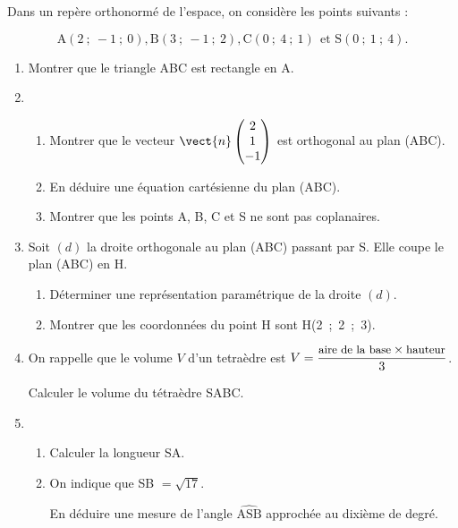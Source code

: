 
\medskip

Dans un repère orthonormé de l'espace, on considère les points suivants :

\[\text{A}(2~;~-1~;~0), \text{B}(3~;~-1~;~2), \text{C}(0~;~4~;~1) \: \: \text{et S} (0~;~1~;~4).\]

\smallskip

\begin{enumerate}
\item Montrer que le triangle ABC est rectangle en A.
\item  
	\begin{enumerate}
		\item Montrer que le vecteur $\vect{n}\begin{pmatrix}2\\1\\- 1\end{pmatrix}$ est orthogonal au plan (ABC).
		\item En déduire une équation cartésienne du plan (ABC).
		\item Montrer que les points A, B, C et S ne sont pas coplanaires.
	\end{enumerate}
\item  Soit $(d)$ la droite orthogonale au plan (ABC) passant par S. Elle coupe le plan (ABC) en H.
	\begin{enumerate}
		\item Déterminer une représentation paramétrique de la droite $(d)$.
		\item Montrer que les coordonnées du point H sont H(2~;~2~;~3).
	\end{enumerate}
\item  On rappelle que le volume $V$ d'un tetraèdre est $V = \dfrac{\small \text{aire de la base} \times \text{hauteur}}{3}$.

 Calculer le volume du tétraèdre SABC.
\item  
	\begin{enumerate}
		\item Calculer la longueur SA.
		\item On indique que SB $= \sqrt{17}$.

En déduire une mesure de l'angle $\widehat{\text{ASB}}$ approchée au dixième de degré.
	\end{enumerate}
\end{enumerate}

\bigskip

